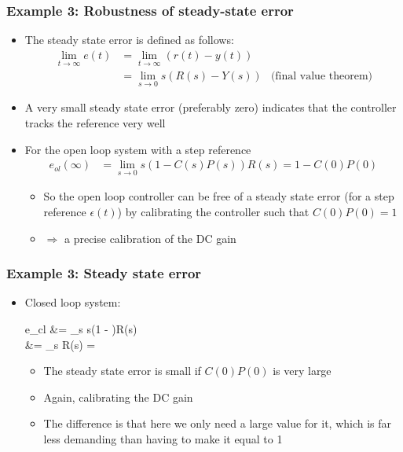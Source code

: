 \begin{frame}
	\frametitle{Example 3: Robustness of steady-state error}
	\begin{itemize}
		\item The steady state error is defined as follows:
		\begin{align*}
			\lim\limits_{t \rightarrow \infty} e(t)
			&= \lim\limits_{t \rightarrow \infty} (r(t) - y(t)) \\
			&= \lim\limits_{s \rightarrow 0} s(R(s) - Y(s)) &\text{(final value theorem)}
		\end{align*}
		
		\item A very small steady state error (preferably zero) indicates that the controller tracks the reference very well
		
		\item For the open loop system with a step reference
		\begin{align*}
			e_{ol}(\infty) &= \lim\limits_{s \rightarrow 0}
			s(1 - C(s)P(s))R(s) = 1 - C(0)P(0)
		\end{align*}
		\begin{itemize}
			\item So the open loop controller can be free of a steady state error (for a step reference $\epsilon(t)$) by calibrating the controller such that $C(0)P(0)=1$
			\item $\Rightarrow$ a precise calibration of the DC gain
		\end{itemize}
	\end{itemize}
	
\end{frame}


\begin{frame}
	\frametitle{Example 3: Steady state error}
	\begin{itemize}
		\item Closed loop system:
		\begin{flalign*}
			e_{cl} &= \lim\limits_{s } s\left(1 - \right)R(s) \\
			&= \lim\limits_{s } R(s) = 
		\end{flalign*}
		\begin{itemize}
			\item The steady state error is small if $C(0)P(0)$ is very large
			\item Again, calibrating the DC gain
			\item The difference is that here we only need a large value for it, which is far less demanding than having to make it equal to 1
		\end{itemize}
	\end{itemize}
\end{frame}

